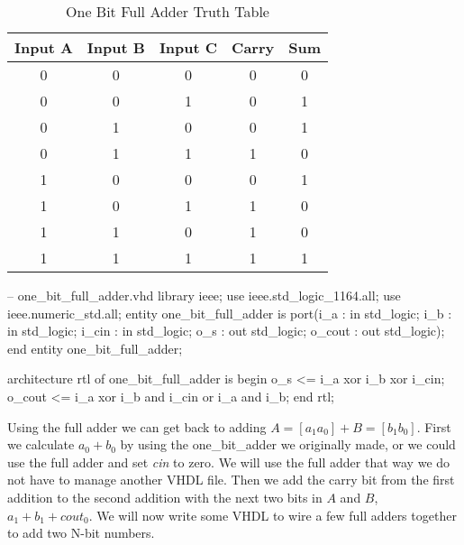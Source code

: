 \begin{table}[h!]  
\begin{center}    
\caption{One Bit Full Adder Truth Table} 
\label{tab:tt2bfa} 
\begin{tabular}{|c|c|c||c|c|}  
\textbf{Input A} & \textbf{Input B} & \textbf{Input C} & \textbf{Carry} & \textbf{Sum}\\  
\hline  
0 & 0 & 0 & 0 & 0\\  
0 & 0 & 1 & 0 & 1\\  
0 & 1 & 0 & 0 & 1\\  
0 & 1 & 1 & 1 & 0\\  
1 & 0 & 0 & 0 & 1\\  
1 & 0 & 1 & 1 & 0\\  
1 & 1 & 0 & 1 & 0\\  
1 & 1 & 1 & 1 & 1\\ 
\end{tabular}  
\end{center}
\end{table}

\begin{VHDLlisting}[tabsize=4]
-- one_bit_full_adder.vhd
library ieee; 
    use ieee.std_logic_1164.all; 
    use ieee.numeric_std.all; 
entity one_bit_full_adder is
port(i_a    : in    std_logic;  
     i_b    : in    std_logic;  
     i_cin  : in    std_logic;  
     o_s    :   out std_logic;  
     o_cout :   out std_logic);
end entity one_bit_full_adder;

architecture rtl of one_bit_full_adder is
begin 
    o_s <= i_a xor i_b xor i_cin; 
    o_cout <= i_a xor i_b and i_cin or i_a and i_b;
end rtl;
\end{VHDLlisting}

Using the full adder we can get back to adding $A=[a_1 a_0] + B=[b_1 b_0]$. First we calculate $a_0 + b_0$ by using the one\_bit\_adder we originally made, or we could use the full adder and set \emph{cin} to zero. We will use the full adder that way we do not have to manage another \ac{VHDL} file. Then we add the carry bit from the first addition to the second addition with the next two bits in $A$ and $B$, $a_1 + b_1 + cout_0$. We will now write some \ac{VHDL} to wire a few full adders together to add two N-bit numbers.  

